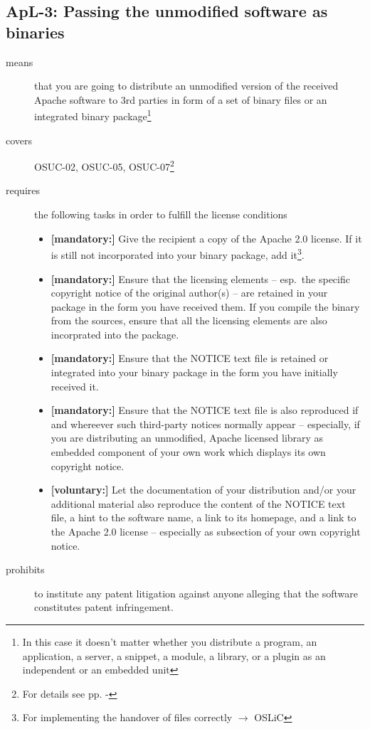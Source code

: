 \subsection{ApL-3: Passing the unmodified software as binaries} 

\begin{description}
\item[means] that you are going to distribute an unmodified version of the
received Apache software to 3rd parties in form of a set of binary files or an
integrated bi\-na\-ry package\footnote{In this case it doesn't matter
whether you  distribute a program, an application, a server, a snippet, a
module, a library, or a plugin as an independent or an embedded unit}

\item[covers] OSUC-02, OSUC-05, OSUC-07\footnote{For details see pp.
\pageref{OSUC-02-DEF} - \pageref{OSUC-07-DEF}}

\item[requires] the following tasks in order to fulfill the license conditions
\begin{itemize}
  \item \textbf{[mandatory:]} Give the recipient a copy of the Apache 2.0
  license. If it is still not incorporated into your binary package, add
  it\footnote{For implementing the handover of files correctly $\rightarrow$
  OSLiC \pageref{DistributingFilesHint}}.
  
  \item \textbf{[mandatory:]} Ensure that the licensing elements -- esp.\ the
  specific copyright notice of the original author(s) -- are retained in your
  package in the form you have received them. If you compile the binary from the
  sources, ensure that all the licensing elements are also incorprated into the
  package.
  \item \textbf{[mandatory:]} Ensure that the NOTICE text file is retained or
  integrated into your binary package in the form you have initially received
  it.
  \item \textbf{[mandatory:]} Ensure that the NOTICE text file is also
  reproduced if and whereever such third-party notices normally appear --
  especially, if you are distributing an unmodified, Apache licensed library as
  embedded component of your own work which displays its own copyright notice.
  
  \item \textbf{[voluntary:]} Let the documentation of your distribution
  and/or your additional material also reproduce the content of the NOTICE text
  file, a hint to the software name, a link to its homepage, and a link to the
  Apache 2.0 license -- especially as subsection of your own copyright notice.
\end{itemize}

\item[prohibits] to institute any patent litigation against anyone alleging that
the software constitutes patent infringement.

\end{description}


